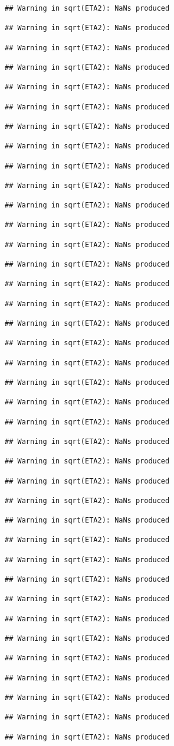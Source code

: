 \documentclass[
]{article}
\begin{document}
\begin{verbatim}
## Warning in sqrt(ETA2): NaNs produced

## Warning in sqrt(ETA2): NaNs produced

## Warning in sqrt(ETA2): NaNs produced

## Warning in sqrt(ETA2): NaNs produced

## Warning in sqrt(ETA2): NaNs produced

## Warning in sqrt(ETA2): NaNs produced

## Warning in sqrt(ETA2): NaNs produced

## Warning in sqrt(ETA2): NaNs produced

## Warning in sqrt(ETA2): NaNs produced

## Warning in sqrt(ETA2): NaNs produced

## Warning in sqrt(ETA2): NaNs produced

## Warning in sqrt(ETA2): NaNs produced

## Warning in sqrt(ETA2): NaNs produced

## Warning in sqrt(ETA2): NaNs produced

## Warning in sqrt(ETA2): NaNs produced

## Warning in sqrt(ETA2): NaNs produced

## Warning in sqrt(ETA2): NaNs produced

## Warning in sqrt(ETA2): NaNs produced

## Warning in sqrt(ETA2): NaNs produced

## Warning in sqrt(ETA2): NaNs produced

## Warning in sqrt(ETA2): NaNs produced

## Warning in sqrt(ETA2): NaNs produced

## Warning in sqrt(ETA2): NaNs produced

## Warning in sqrt(ETA2): NaNs produced

## Warning in sqrt(ETA2): NaNs produced

## Warning in sqrt(ETA2): NaNs produced

## Warning in sqrt(ETA2): NaNs produced

## Warning in sqrt(ETA2): NaNs produced

## Warning in sqrt(ETA2): NaNs produced

## Warning in sqrt(ETA2): NaNs produced

## Warning in sqrt(ETA2): NaNs produced

## Warning in sqrt(ETA2): NaNs produced

## Warning in sqrt(ETA2): NaNs produced

## Warning in sqrt(ETA2): NaNs produced

## Warning in sqrt(ETA2): NaNs produced

## Warning in sqrt(ETA2): NaNs produced

## Warning in sqrt(ETA2): NaNs produced

## Warning in sqrt(ETA2): NaNs produced
\end{verbatim}
\end{document}
